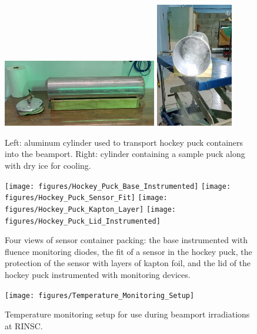 \iffalse      %
\begin{figure}[!hbt]
  \begin{center}
    \includegraphics[width=0.60\textwidth]{figures/Cylinder_Side_View}
    \includegraphics[width=0.30\textwidth]{figures/Cylinder_With_Dry_Ice}
    \caption{Left: aluminum cylinder used to transport hockey puck containers into the beamport. Right: cylinder containing a sample puck along with dry ice for cooling.}
    \label{fig:Cylinder_Details}
  \end{center}
\end{figure}

\begin{figure}[!hbt]
  \begin{center}
    \texttt{[image: figures/Hockey\_Puck\_Base\_Instrumented]}  
    \texttt{[image: figures/Hockey\_Puck\_Sensor\_Fit]}
    \texttt{[image: figures/Hockey\_Puck\_Kapton\_Layer]}
    \texttt{[image: figures/Hockey\_Puck\_Lid\_Instrumented]}    
    \caption{Four views of sensor container packing: the base instrumented with fluence monitoring diodes, the fit of a sensor in the hockey puck, the protection of the sensor with layers of kapton foil, and the lid of the hockey puck instrumented with monitoring devices.}
    \label{fig:Puck_Packing}
  \end{center}
\end{figure}

\begin{figure}[!hbt]
  \begin{center}
    \texttt{[image: figures/Temperature\_Monitoring\_Setup]}
    \caption{Temperature monitoring setup for use during beamport irradiations at RINSC.}
    \label{fig:Temperature_Monitoring_Setup}
  \end{center}
\end{figure}

